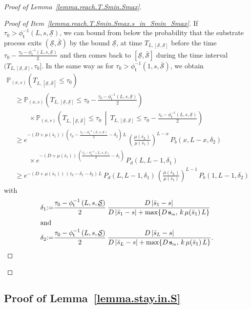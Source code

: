 \documentclass[AHL,Unicode,longabstracts,published]{cedram}
\newcommand{\PP}{\mathbb{P}}
\newcommand{\Sin}{{\mathbf s}_{\textrm{\tiny\rm in}}}
\newcommand{\Smin}{\underline{\mathcal{S}}}
\newcommand{\Smax}{\bar{\mathcal{S}}}
\newcommand{\barmu}{\mu(\bar s_1)}
\newcommand{\phit}{\phi_\textsf{t}^{-1}}
\newcommand{\1}{\mathbf{1}}
\begin{document}
\begin{proof}[Proof of Lemma~\ref{lemma.reach.T.Smin.Smax}]
\begin{proof}[{Proof of Item~\eqref{lemma.reach.T.Smin.Smax.s_in_Smin_Smax}}]
If $\tau_0>\phit\left(L, s,\Smin\right)$, we can bound from below the probability that the substrate process exits $(\Smin,\Smax)$ by the bound $\Smin$, at time $T_{L,[\Smin,\Smin]}$ before the time $\tau_0-\frac{\tau_0-\phit\left(L, s,\Smin\right)}{2}$ and then comes back to $[\Smin,\Smax]$ during the time interval $(T_{L,[\Smin,\Smin]},\tau_0]$. In the same way as for $\tau_0>\phit\left(1, s,\Smax\right)$, we obtain
\begin{multline*}
 \PP_{(x,s)}\left(T_{L,[\Smin,\Smax]}\leq \tau_0\right)\\
\begin{aligned}
&\geq
\PP_{(x,s)}\left(T_{L,[\Smin,\Smin]}\leq \tau_0-\frac{\tau_0-\phit\left(L, s,\Smin\right)}{2}\right)
\\
& \qquad\times
\PP_{(x,s)}\left(T_{L,[\Smin,\Smax]}\leq\tau_0 \ \middle| \ T_{L,[\Smin,\Smin]}\leq \tau_0-\frac{\tau_0-\phit\left(L, s,\Smin\right)}{2} \right)
\\
&\geq e^{-(D+\barmu)\,\left(\tau_0-\frac{\tau_0-\phit\left(L, s,\Smin\right)}{2}-\delta_2\right)\,L}\,
\left(\frac{\mu(\bar s_L)}{\barmu}\right)^{L-x}\,P_b(x,L-x, \delta_2)
\\
& \qquad
\times e^{-(D+\barmu)\,\left(\frac{\tau_0-\phit\left(L, s,\Smin\right)}{2}-\delta_1\right)}\, P_d(L,L-1, \delta_1)
\\
&\geq e^{-(D+\barmu)\,\left(\tau_0-\delta_1-\delta_2\right)\,L}\, P_d(L,L-1, \delta_1)\,
\left(\frac{\mu(\bar s_L)}{\barmu}\right)^{L-1}\,P_b(1,L-1, \delta_2)
\end{aligned}
\end{multline*}
with 
\begin{align*}
\delta_1 &{:=}\frac{\tau_0-\phit\left(L, s,\Smin\right)}{2}\,\frac{D\,|\bar s_1-s|}{D\,|\bar s_1-s|+\max\{D\,\Sin,\,k\,\barmu\,L\}}\\
\intertext{and}
\delta_2 &{:=}\frac{\tau_0-\phit\left(L, s,\Smin\right)}{2}\,\frac{D\,|\bar s_L-s|}{D\,|\bar s_L-s|+\max\{D\,\Sin,\,k\,\barmu\,L\}}.\qedhere
\end{align*}
\end{proof}\let\qed\relax
\end{proof}



\subsection{Proof of Lemma~\ref{lemma.stay.in.S}}\label{sec:stay.in.S}
\end{document}
